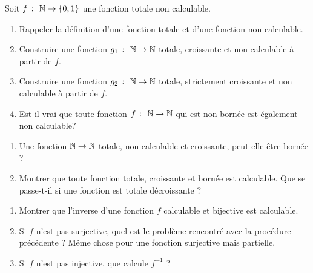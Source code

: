 \documentclass[french,a4paper,10pt]{article}
\begin{document}
	\begin{td-exo}[]
		Soit $f~\colon~\mathbb{N}\to\{0,1\}$ une fonction totale non calculable.
			\begin{enumerate}
				\item Rappeler la définition d'une fonction totale et d'une fonction non calculable.
				
				\item Construire une fonction $g_1~\colon~\mathbb{N}\to\mathbb{N}$ totale, croissante et non calculable à partir de $f$.
				
				\item Construire une fonction $g_2~\colon~\mathbb{N}\to\mathbb{N}$ totale, strictement croissante et non calculable à partir de $f$.
				
				\item Est-il vrai que toute fonction $f~\colon~\mathbb{N}\to\mathbb{N}$ qui est non bornée est également non calculable?
			\end{enumerate}
		
	\end{td-exo}
	\begin{td-exo}[16 - Calculabilité]
		\begin{enumerate}
			\item Une fonction $\mathbb{N}\to\mathbb{N}$ totale, non calculable et croissante, peut-elle être bornée ?
			
			\item Montrer que toute fonction totale, croissante et bornée est calculable. Que se passe-t-il si une fonction est totale décroissante ?
		\end{enumerate}
		
	\end{td-exo}
	
	\begin{td-exo}[17 - Calculabilité]
		\begin{enumerate}
			\item Montrer que l'inverse d'une fonction $f$ calculable et bijective est calculable.
			
			\item Si $f$ n'est pas surjective, quel est le problème rencontré avec la procédure précédente ? Même chose pour une fonction surjective mais partielle.
			
			\item Si $f$ n'est pas injective, que calcule $f^{-1}$ ?
		\end{enumerate}
		
	\end{td-exo}
	
\end{document}
